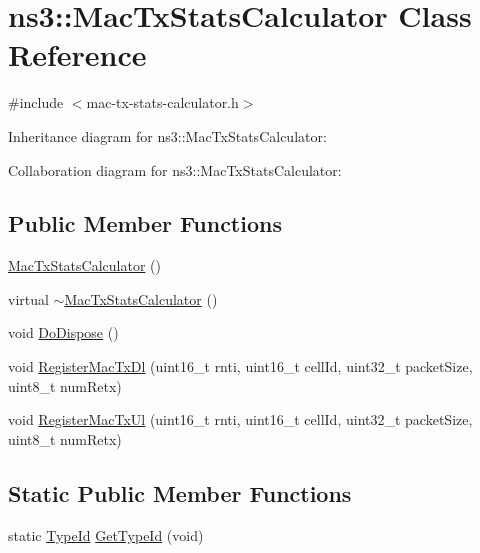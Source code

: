 \hypertarget{classns3_1_1MacTxStatsCalculator}{}\section{ns3\+:\+:Mac\+Tx\+Stats\+Calculator Class Reference}
\label{classns3_1_1MacTxStatsCalculator}


{\ttfamily \#include $<$mac-\/tx-\/stats-\/calculator.\+h$>$}



Inheritance diagram for ns3\+:\+:Mac\+Tx\+Stats\+Calculator\+:


Collaboration diagram for ns3\+:\+:Mac\+Tx\+Stats\+Calculator\+:
\subsection*{Public Member Functions}
\begin{DoxyCompactItemize}
\item 
\hyperlink{classns3_1_1MacTxStatsCalculator_a9b003b4352a889307b9eed26af1ebbde}{Mac\+Tx\+Stats\+Calculator} ()
\item 
virtual \hyperlink{classns3_1_1MacTxStatsCalculator_a8b02a5e237c889c8b425b2986d91561d}{$\sim$\+Mac\+Tx\+Stats\+Calculator} ()
\item 
void \hyperlink{classns3_1_1MacTxStatsCalculator_ae77d97d43411c1ec8942a66f35d314b9}{Do\+Dispose} ()
\item 
void \hyperlink{classns3_1_1MacTxStatsCalculator_a174df142b795fc82a71286051c5a8c1f}{Register\+Mac\+Tx\+Dl} (uint16\+\_\+t rnti, uint16\+\_\+t cell\+Id, uint32\+\_\+t packet\+Size, uint8\+\_\+t num\+Retx)
\item 
void \hyperlink{classns3_1_1MacTxStatsCalculator_a76fc5527347c5fe5f45e6c3934d11d43}{Register\+Mac\+Tx\+Ul} (uint16\+\_\+t rnti, uint16\+\_\+t cell\+Id, uint32\+\_\+t packet\+Size, uint8\+\_\+t num\+Retx)
\end{DoxyCompactItemize}
\subsection*{Static Public Member Functions}
\begin{DoxyCompactItemize}
\item 
static \hyperlink{classns3_1_1TypeId}{Type\+Id} \hyperlink{classns3_1_1MacTxStatsCalculator_a50ca8e8c15465ef8f01d435d89b732e5}{Get\+Type\+Id} (void)
\end{DoxyCompactItemize}
